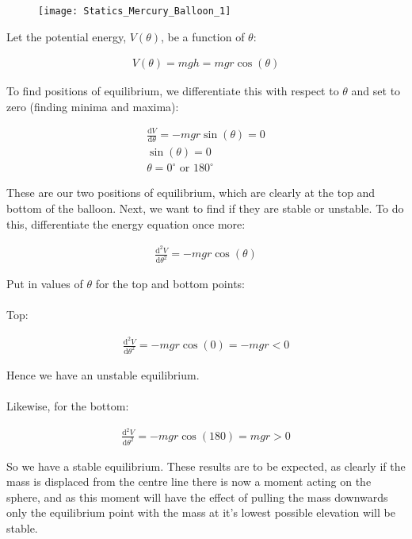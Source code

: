 \begin{problem}
{\begin{figure}
	\centering
	\texttt{[image: Statics\_Mercury\_Balloon\_1]}
	\caption{}	
	\label{fig:Statics_Mercury_Balloon_1}
\end{figure}

Let the potential energy, $V(\theta)$, be a function of $\theta$:

\begin{align*} V(\theta) = mgh = mgr\cos(\theta)\end{align*}

To find positions of equilibrium, we differentiate this with respect to $\theta$ and set to zero (finding minima and maxima):

\begin{align*} \frac{\textrm{d}V}{\textrm{d}\theta} = -mgr\sin(\theta) = 0 \\
\sin(\theta) = 0 \\
\theta = 0^{\circ} \textrm{ or } 180^{\circ} \end{align*}

These are our two positions of equilibrium, which are clearly at the top and bottom of the balloon. Next, we want to find if they are stable or unstable. To do this, differentiate the energy equation once more:

\begin{align*} \frac{\textrm{d}^{2}V}{\textrm{d}{\theta}^2} = -mgr\cos(\theta) \end{align*}

Put in values of $\theta$ for the top and bottom points:\\
\\ Top:

\begin{align*} \frac{\textrm{d}^{2}V}{\textrm{d}{\theta}^2} = -mgr\cos(0) = -mgr < 0 \end{align*}

Hence we have an unstable equilibrium. \\
\\Likewise, for the bottom:

\begin{align*} \frac{\textrm{d}^{2}V}{\textrm{d}{\theta}^2} = -mgr\cos(180) = mgr > 0 \end{align*}

So we have a stable equilibrium. These results are to be expected, as clearly if the mass is displaced from the centre line there is now a moment acting on the sphere, and as this moment will have the effect of pulling the mass downwards only the equilibrium point with the mass at it's lowest possible elevation will be stable.

}
\end{problem}
